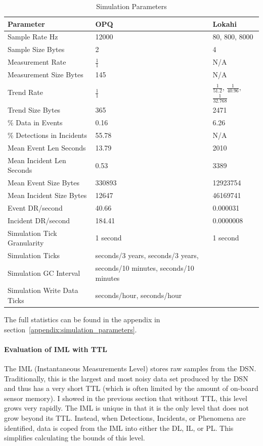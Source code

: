\begin{table}[H]
	\centering
	\caption{Simulation Parameters}
	\begin{tabularx}{\textwidth}{Xll}
		\toprule
		\textbf{Parameter} & \textbf{OPQ} & \textbf{Lokahi} \\
		\midrule
		Sample Rate Hz & 12000 & 80, 800, 8000 \\
		Sample Size Bytes & 2 & 4 \\
		Measurement Rate & $\frac{1}{1}$ & N/A \\
		Measurement Size Bytes & 145 & N/A \\
		Trend Rate & $\frac{1}{1}$ & $\frac{1}{51.2}$, $\frac{1}{40.96}$, $\frac{1}{32.768}$ \\
		Trend Size Bytes & 365 & 2471 \\
		\% Data in Events & 0.16 & 6.26 \\
		\% Detections in Incidents & 55.78 & N/A \\
		Mean Event Len Seconds & 13.79 & 2010 \\
		Mean Incident Len Seconds & 0.53 & 3389 \\
		Mean Event Size Bytes & 330893 & 12923754 \\
		Mean Incident Size Bytes & 12647 & 46169741 \\
		Event DR/second & 40.66 &  0.000031 \\
		Incident DR/second & 184.41 &  0.0000008 \\
		Simulation Tick Granularity & 1 second & 1 second \\
		Simulation Ticks & seconds/3 years, seconds/3 years, \\
		Simulation GC Interval & seconds/10 minutes, seconds/10 minutes \\
		Simulation Write Data Ticks & seconds/hour, seconds/hour \\
		\bottomrule
	\end{tabularx}
	\label{table:sim_params}
\end{table}

The full statistics can be found in the appendix in section~\ref{appendix:simulation_parameters}.

\paragraph{Evaluation of IML with TTL}
The IML (Instantaneous Measurements Level) stores raw samples from the DSN. Traditionally, this is the largest and most noisy data set produced by the DSN and thus has a very short TTL (which is often limited by the amount of on-board sensor memory). I showed in the previous section that without TTL, this level grows very rapidly. The IML is unique in that it is the only level that does not grow beyond its TTL. Instead, when Detections, Incidents, or Phenomena are identified, data is coped from the IML into either the DL, IL, or PL. This simplifies calculating the bounds of this level.

